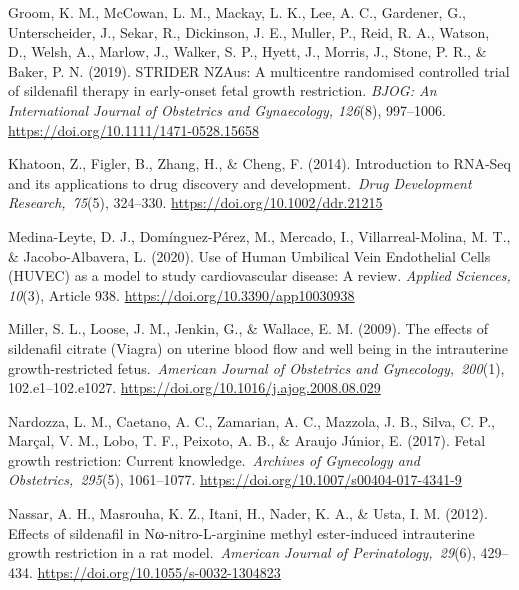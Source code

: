 \documentclass[authordate, reflection]{jote-new-article}
\begin{document}
	Groom, K. M., McCowan, L. M., Mackay, L. K., Lee, A. C., Gardener, G., Unterscheider, J., Sekar, R., Dickinson, J. E., Muller, P., Reid, R. A., Watson, D., Welsh, A., Marlow, J., Walker, S. P., Hyett, J., Morris, J., Stone, P. R., \& Baker, P. N. (2019). STRIDER NZAus: A multicentre randomised controlled trial of sildenafil therapy in early-onset fetal growth restriction. \emph{BJOG: An International Journal of Obstetrics and Gynaecology, 126}(8), 997--1006. \url{https://doi.org/10.1111/1471-0528.15658}







	Khatoon, Z., Figler, B., Zhang, H., \& Cheng, F. (2014). Introduction to RNA-Seq and its applications to drug discovery and development. \emph{Drug Development Research, 75}(5), 324--330. \url{https://doi.org/10.1002/ddr.21215}







	Medina-Leyte, D. J., Domínguez-Pérez, M., Mercado, I., Villarreal-Molina, M. T., \& Jacobo-Albavera, L. (2020). Use of Human Umbilical Vein Endothelial Cells (HUVEC) as a model to study cardiovascular disease: A review. \emph{Applied Sciences,} \emph{10}(3), Article 938. \url{https://doi.org/10.3390/app10030938}







	Miller, S. L., Loose, J. M., Jenkin, G., \& Wallace, E. M. (2009). The effects of sildenafil citrate (Viagra) on uterine blood flow and well being in the intrauterine growth-restricted fetus. \emph{American Journal of Obstetrics and Gynecology, 200}(1), 102.e1--102.e1027. \url{https://doi.org/10.1016/j.ajog.2008.08.029}







	Nardozza, L. M., Caetano, A. C., Zamarian, A. C., Mazzola, J. B., Silva, C. P., Marçal, V. M., Lobo, T. F., Peixoto, A. B., \& Araujo Júnior, E. (2017). Fetal growth restriction: Current knowledge. \emph{Archives of Gynecology and Obstetrics, 295}(5), 1061--1077. \url{https://doi.org/10.1007/s00404-017-4341-9}



	Nassar, A. H., Masrouha, K. Z., Itani, H., Nader, K. A., \& Usta, I. M. (2012). Effects of sildenafil in Nω-nitro-L-arginine methyl ester-induced intrauterine growth restriction in a rat model. \emph{American Journal of Perinatology, 29}(6), 429--434. \url{https://doi.org/10.1055/s-0032-1304823}
\end{document}
